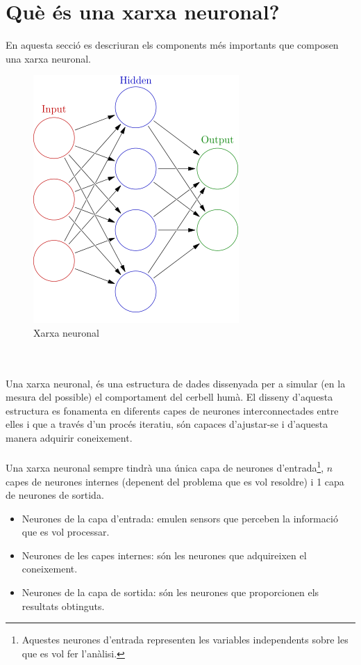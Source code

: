 \documentclass[12pt]{article}
\begin{document}
\section{Què és una xarxa neuronal?}
En aquesta secció es descriuran els components més importants que composen una xarxa neuronal.
\begin{figure}[h!]
	\centering
	\includegraphics[scale=.5]{imatges/xnn.png}
	\caption{Xarxa neuronal}
\end{figure}
\\\\Una xarxa neuronal, és una estructura de dades dissenyada per a simular (en la mesura del possible) el comportament del cerbell humà. El disseny d'aquesta estructura es fonamenta en diferents capes de neurones interconnectades entre elles i que a través d'un procés iteratiu, són capaces d'ajustar-se i d'aquesta manera adquirir coneixement.
\\\\Una xarxa neuronal sempre tindrà una única capa de neurones d'entrada\footnote{Aquestes neurones d'entrada representen les variables independents sobre les que es vol fer l'anàlisi.}, $n$ capes de neurones internes (depenent del problema que es vol resoldre) i 1 capa de neurones de sortida.
\begin{itemize}
	\item Neurones de la capa d'entrada: emulen sensors que perceben la informació que es vol processar.
	\item Neurones de les capes internes: són les neurones que adquireixen el coneixement.
	\item Neurones de la capa de sortida: són les neurones que proporcionen els resultats obtinguts.
\end{itemize}
\end{document}
